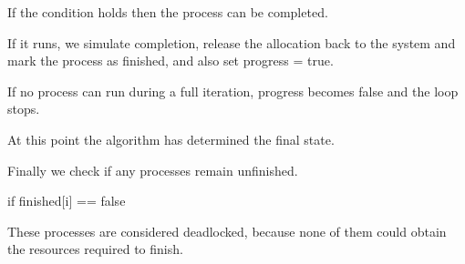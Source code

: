 If the condition holds then the process can be completed.

If it runs, we simulate completion, release the allocation back to the
system and mark the process as finished, and also set progress = true.

If no process can run during a full iteration, progress becomes false
and the loop stops.

At this point the algorithm has determined the final state.

Finally we check if any processes remain unfinished.

if finished{[}i{]} == false

These processes are considered deadlocked, because none of them could
obtain the resources required to finish.
